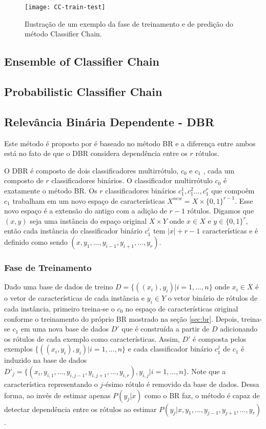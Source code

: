 \begin{figure}

 \texttt{[image: CC-train-test]}
 \caption{Ilustração de um exemplo da fase de treinamento e de predição do método Classifier Chain.}
\label{fig:CCtraintest}
\end{figure}


\subsection{Ensemble of Classifier Chain}
\subsection{Probabilistic Classifier Chain}
\subsection{Relevância Binária Dependente - DBR}
\label{sec:dbr}
Este método é proposto por \cite{dbr2014} é baseado no método BR
e a diferença entre ambos está no fato de 
que o DBR considera dependência entre os $r$ rótulos.

O DBR é composto de dois classificadores multirrótulo, $c_0$ e $c_1$ , 
cada um composto de $r$ classificadores binários. O classificador multirrótulo $c_0$ é
exatamente o método BR. Os $r$ classificadores binários $c_1^1,c_1^2...,c_1^r$ que compoêm $c_1$ 
  trabalham em um novo espaço de características $X^{new}=X \times \{0,1\}^{r-1}$.
  Esse novo espaço é a extensão do antigo com a adição de $r-1$ rótulos.
  Digamos que $(x,y)$ seja uma instância do espaço original $X \times Y$
  onde $x \in X$ e $y \in {\{0,1\}}^{r}$, então cada instância
  do classificador binário $c_1^i$ tem $|x|+r-1$ características
  e é definido como sendo $(x,y_1,...,y_{i-1},y_{i+1},...,y_{r})$.
  
  \subsubsection{Fase de Treinamento}
  Dado uma base de dados de treino $D=\{((x_i),y_i)|i=1,...,n\}$ onde $x_i \in X$ é o vetor de características de cada instância
  e $y_i \in Y$ o vetor binário de rótulos de cada instância,
  primeiro treina-se o $c_0$
  no espaço de características original conforme o treinamento do próprio BR mostrado na seção \ref{sec:br}.
  Depois, treina-se $c_1$ em uma nova base de dados $D'$ que é construída a partir de $D$ adicionando os rótulos de cada
  exemplo como características. Assim, $D'$ é composta pelos exemplos $\{((x_i,y_i),y_i) |i=1,...,n\}$ e
  cada classificador binário $c_1^j$ de $c_1$ é induzido na base de dados $D'_j=\{(x_i,y_{i,1},...,y_{i,j-1},y_{i,j+1},...,y_{i,r}),y_{i,j} | i=1,...,n\}$.
  Note que a característica representando o $j$-ésimo rótulo é removido da base de dados.
  Dessa forma, ao invés de estimar apenas $P(y_j|x)$ como o BR faz, o método é capaz de detectar dependência entre os rótulos ao
  estimar $P(y_j|x,y_1,...,y_{j-1},y_{j+1},...,y_r)$.
  
